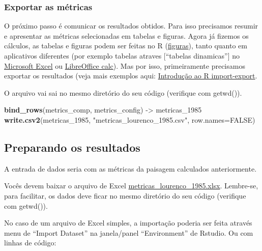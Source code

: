 \documentclass[
]{article}
\newenvironment{Shaded}{\begin{snugshade}}{\end{snugshade}}
\newcommand{\AttributeTok}[1]{\textcolor[rgb]{0.13,0.29,0.53}{#1}}
\newcommand{\ConstantTok}[1]{\textcolor[rgb]{0.56,0.35,0.01}{#1}}
\newcommand{\FunctionTok}[1]{\textcolor[rgb]{0.13,0.29,0.53}{\textbf{#1}}}
\newcommand{\NormalTok}[1]{#1}
\newcommand{\OtherTok}[1]{\textcolor[rgb]{0.56,0.35,0.01}{#1}}
\newcommand{\StringTok}[1]{\textcolor[rgb]{0.31,0.60,0.02}{#1}}
\begin{document}
\hypertarget{exportar-as-muxe9tricas}{%
\subsubsection{Exportar as métricas}\label{exportar-as-muxe9tricas}}

O próximo passo é comunicar os resultados obtidos. Para isso
precisamos resumir e apresentar as métricas selecionadas em tabelas e
figuras. Agora já fizemos os cálculos, as tabelas e
figuras podem ser feitas no R (\href{https://www.youtube.com/watch?v=0RxEDDiRzQY}{figuras}), tanto quanto
em aplicativos diferentes
(por exemplo tabelas atraves {[}``tabelas dinamicas''{]} no \href{https://www.techtudo.com.br/dicas-e-tutoriais/2018/10/como-fazer-tabela-dinamica-no-excel.ghtml}{Microsoft Excel} ou \href{https://www.youtube.com/watch?v=Mqi5BJwzAzo}{LibreOffice calc}).
Mas por isso, primeiramente precisamos exportar os resultados
(veja mais exemplos aqui: \href{https://www.lampada.uerj.br/arquivosdb/_book2/importexport.html}{Introdução ao R import-export}.

O arquivo vai sai no mesmo diretório do seu código
(verifique com getwd()).

\begin{Shaded}
\begin{Highlighting}[]
\FunctionTok{bind\_rows}\NormalTok{(metrics\_comp, metrics\_config) }\OtherTok{{-}\textgreater{}}\NormalTok{ metricas\_1985}
\FunctionTok{write.csv2}\NormalTok{(metricas\_1985, }\StringTok{"metricas\_lourenco\_1985.csv"}\NormalTok{, }\AttributeTok{row.names=}\ConstantTok{FALSE}\NormalTok{)}
\end{Highlighting}
\end{Shaded}

\hypertarget{preparando-os-resultados}{%
\subsection{Preparando os resultados}\label{preparando-os-resultados}}

A entrada de dados seria com as métricas da paisagem calculados
anteriormente.

Vocês devem baixar o arquivo de Excel \href{https://github.com/darrennorris/Amapa-mine/blob/main/data/metricas_lourenco_1985.xlsx}{metricas\_lourenco\_1985.xlsx}.
Lembre-se, para facilitar, os dados deve ficar no
mesmo diretório do seu código (verifique com getwd()).

No caso de um arquivo de Excel simples, a importação poderia ser
feita através menu de ``Import Dataset'' na janela/panel ``Environment''
de Rstudio.
Ou com linhas de código:
\end{document}
